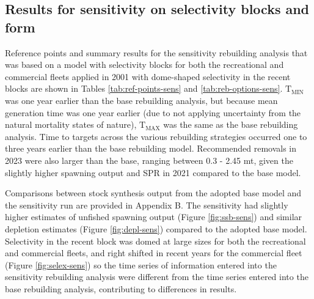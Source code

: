 \documentclass[11pt,
  english,
  a4paper,
]{article}
\begin{document}

\hypertarget{results-for-sensitivity-on-selectivity-blocks-and-form}{%
\subsection{Results for sensitivity on selectivity blocks and form}\label{results-for-sensitivity-on-selectivity-blocks-and-form}}

\leavevmode\tagmcend\tagstructend


Reference points and summary results for the sensitivity rebuilding analysis that was based on a model with selectivity blocks for both the recreational and commercial fleets applied in 2001 with dome-shaped selectivity in the recent blocks are shown in Tables \ref{tab:ref-points-sens} and \ref{tab:reb-options-sens}. {\(\text{T}_\text{MIN}\)\leavevmode\tagmcend\tagstructend} was one year earlier than the base rebuilding analysis, but because mean generation time was one year earlier (due to not applying uncertainty from the natural mortality states of nature), {\(\text{T}_\text{MAX}\)\leavevmode\tagmcend\tagstructend} was the same as the base rebuilding analysis. Time to targets across the various rebuilding strategies occurred one to three years earlier than the base rebuilding model. Recommended removals in 2023 were also larger than the base, ranging between 0.3 - 2.45 mt, given the slightly higher spawning output and SPR in 2021 compared to the base model.

\leavevmode\tagmcend\tagstructend\par


Comparisons between stock synthesis output from the adopted base model and the sensitivity run are provided in \protect\hypertarget{append_b}{}{Appendix B}. The sensitivity had slightly higher estimates of unfished spawning output (Figure \ref{fig:ssb-sens}) and similar depletion estimates (Figure \ref{fig:depl-sens}) compared to the adopted base model. Selectivity in the recent block was domed at large sizes for both the recreational and commercial fleets, and right shifted in recent years for the commercial fleet (Figure \ref{fig:selex-sens}) so the time series of information entered into the sensitivity rebuilding analysis were different from the time series entered into the base rebuilding analysis, contributing to differences in results.
\end{document}
